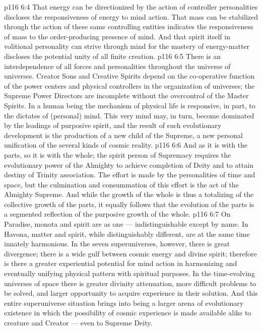 \vs p116 6:4 \pc That energy can be directionized by the action of controller personalities discloses the responsiveness of energy to mind action. That mass can be stabilized through the action of these same controlling entities indicates the responsiveness of mass to the order\hyp{}producing presence of mind. And that spirit itself in volitional personality can strive through mind for the mastery of energy\hyp{}matter discloses the potential unity of all finite creation.
\vs p116 6:5 There is an interdependence of all forces and personalities throughout the universe of universes. Creator Sons and Creative Spirits depend on the co\hyp{}operative function of the power centers and physical controllers in the organization of universes; the Supreme Power Directors are incomplete without the overcontrol of the Master Spirits. In a human being the mechanism of physical life is responsive, in part, to the dictates of (personal) mind. This very mind may, in turn, become dominated by the leadings of purposive spirit, and the result of such evolutionary development is the production of a new child of the Supreme, a new personal unification of the several kinds of cosmic reality.
\vs p116 6:6 And as it is with the parts, so it is with the whole; the spirit person of Supremacy requires the evolutionary power of the Almighty to achieve completion of Deity and to attain destiny of Trinity association. The effort is made by the personalities of time and space, but the culmination and consummation of this effort is the act of the Almighty Supreme. And while the growth of the whole is thus a totalizing of the collective growth of the parts, it equally follows that the evolution of the parts is a segmented reflection of the purposive growth of the whole.
\vs p116 6:7 On Paradise, monota and spirit are as one --- indistinguishable except by name. In Havona, matter and spirit, while distinguishably different, are at the same time innately harmonious. In the seven superuniverses, however, there is great divergence; there is a wide gulf between cosmic energy and divine spirit; therefore is there a greater experiential potential for mind action in harmonizing and eventually unifying physical pattern with spiritual purposes. In the time\hyp{}evolving universes of space there is greater divinity attenuation, more difficult problems to be solved, and larger opportunity to acquire experience in their solution. And this entire superuniverse situation brings into being a larger arena of evolutionary existence in which the possibility of cosmic experience is made available alike to creature and Creator --- even to Supreme Deity.
